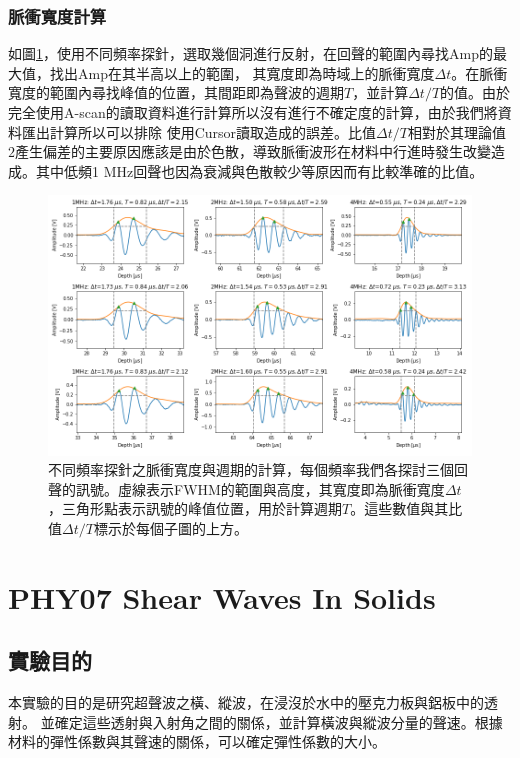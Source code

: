 \documentclass[12pt]{report}
\begin{document}
\subsection{脈衝寬度計算}\label{sec:pulse_width}

如圖\ref{fig:06p}，使用不同頻率探針，選取幾個洞進行反射，在回聲的範圍內尋找Amp的最大值，找出Amp在其半高以上的範圍，
其寬度即為時域上的脈衝寬度$\Delta t$。在脈衝寬度的範圍內尋找峰值的位置，其間距即為聲波的週期$T$，並計算$\Delta t/T$的值。由於完全使用A-scan的讀取資料進行計算所以沒有進行不確定度的計算，由於我們將資料匯出計算所以可以排除
使用Cursor讀取造成的誤差。比值$\Delta t/T$相對於其理論值$2$產生偏差的主要原因應該是由於色散，導致脈衝波形在材料中行進時發生改變造成。其中低頻1 MHz回聲也因為衰減與色散較少等原因而有比較準確的比值。

\begin{figure}[htbp]
    \centering
    \includegraphics[width=1\linewidth]{PHY06_pulse_width.png}
    \caption{不同頻率探針之脈衝寬度與週期的計算，每個頻率我們各探討三個回聲的訊號。虛線表示FWHM的範圍與高度，其寬度即為脈衝寬度$\Delta t$，三角形點表示訊號的峰值位置，用於計算週期$T$。這些數值與其比值$\Delta t/T$標示於每個子圖的上方。}
    \label{fig:06p}
\end{figure}


\chapter{PHY07 Shear Waves In Solids}\label{PHY07}

\section{實驗目的}
本實驗的目的是研究超聲波之橫、縱波，在浸沒於水中的壓克力板與鋁板中的透射。
並確定這些透射與入射角之間的關係，並計算橫波與縱波分量的聲速。根據材料的彈性係數與其聲速的關係，可以確定彈性係數的大小。
\end{document}
